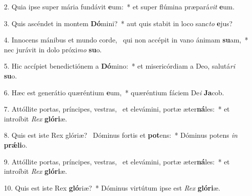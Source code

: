 2. Quia ipse super mária fundávit \textbf{e}um:~*  et super flúmina præpará\textit{vit} \textbf{e}um.\

3. Quis ascéndet in montem \textbf{Dó}mini?~*  aut quis stabit in loco sanc\textit{to} \textbf{e}jus?\

4. Innocens mánibus et mundo corde, \dag\  qui non accépit in vano ánimam \textbf{su}am,~*  nec jurávit in dolo próxi\textit{mo} \textbf{su}o.\

5. Hic accípiet benedictiónem a \textbf{Dó}mino:~*  et misericórdiam a Deo, salutá\textit{ri} \textbf{su}o.\

6. Hæc est generátio quæréntium \textbf{e}um,~*  quæréntium fáciem De\textit{i} \textbf{Ja}cob.\

7. Attóllite portas, príncipes, vestras, \dag\  et elevámini, portæ æter\textbf{ná}les:~*  et introíbit \textit{Rex} \textbf{gló}\textbf{ri}æ.\

8. Quis est iste Rex glóriæ? \dag\  Dóminus fortis et \textbf{pot}ens:~*  Dóminus potens \textit{in} \textbf{prǽ}\textbf{li}o.\

9. Attóllite portas, príncipes, vestras, \dag\  et elevámini, portæ æter\textbf{ná}les:~*  et introíbit \textit{Rex} \textbf{gló}\textbf{ri}æ.\

10. Quis est iste Rex \textbf{gló}riæ?~*  Dóminus virtútum ipse est \textit{Rex} \textbf{gló}\textbf{ri}æ.\

